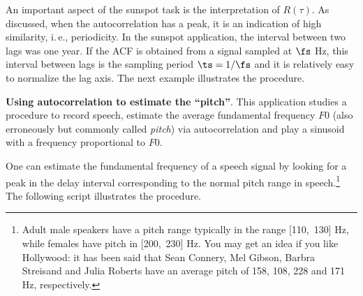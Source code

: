 An important aspect of the sunspot task is the interpretation of $R(\tau)$. As discussed, when the autocorrelation has a peak, it is an indication of high similarity, i.\,e., periodicity.
In the sunspot application, the interval between two lags was one year. If the ACF is obtained from a signal sampled at $\fs$ Hz, this interval between lags is the sampling period $\ts=1/\fs$ and it is relatively easy to normalize the lag axis. The next example illustrates the procedure.
\eApplication

\bApplication \textbf{Using autocorrelation to estimate the ``pitch''}.
\label{app:pitch}
This application studies a procedure to record speech, estimate the average fundamental frequency $F0$ (also erroneously but commonly called \emph{pitch}) via autocorrelation and play a sinusoid with a frequency proportional to $F0$. 

One can estimate the fundamental frequency of a speech signal by looking for a peak in the delay interval corresponding to the normal pitch range in speech.\footnote{Adult male speakers have a pitch range typically in the range [110,~130] Hz, while females have pitch in [200,~230] Hz. You may get an idea if you like Hollywood: it has been said that Sean Connery, Mel Gibson, Barbra Streisand and Julia Roberts have an average pitch of 158, 108, 228 and 171 Hz, respectively.} The following script illustrates the procedure.


